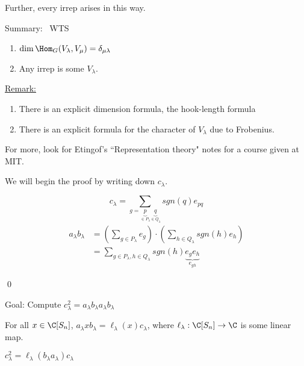 \documentclass[x11names,reqno,14pt]{extarticle}
\begin{document}
Further, every irrep arises in this way. 

\proof

Summary: \, WTS
\begin{enumerate}

\item $\dim\Hom_G(V_\lambda,V_\mu) = \delta_{\mu\lambda}$

\item Any irrep is some $V_\lambda$.

\end{enumerate}

\underline{Remark:}
\,
\begin{enumerate}

\item There is an explicit dimension formula, the hook-length formula

\item There is an explicit formula for the character of $V_\lambda$ due to Frobenius. 

\end{enumerate}

For more, look for Etingof's ``Representation theory" notes for a course given at MIT. 

We will begin the proof by writing down $c_\lambda$. 

\lem

\[
c_\lambda = \sum_{g = \underbrace{p}_{\in P_\lambda}\underbrace{q}_{\in Q_\lambda}}sgn(q)e_{pq}
\]
\proof
\begin{align*}
a_\lambda b_\lambda & = \left(\sum_{g\in P_\lambda}e_g\right) \cdot \left(\sum_{h\in Q_\lambda}sgn(h)e_h\right)\\
& = \sum_{g\in P_\lambda, h \in Q_\lambda} sgn(h)\underbrace{e_ge_h}_{e_{gh}}
\end{align*}

\qed

Goal: Compute $c_\lambda^2 = a_\lambda b_\lambda a_\lambda b_\lambda$

\lem

For all $x \in \C[S_n]$, $a_\lambda x b_\lambda = \ell_\lambda(x)c_\lambda$, where $\ell_\lambda:\C[S_n]\to\C$ is some linear map. 

\cor

$c_\lambda^2 = \ell_\lambda(b_\lambda a_\lambda)c_\lambda$

\proof
\end{document}
